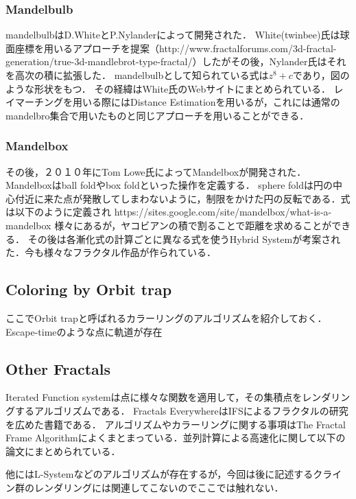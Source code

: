 \subsubsection{Mandelbulb}
mandelbulbはD.WhiteとP.Nylanderによって開発された．
White(twinbee)氏は球面座標を用いるアプローチを提案（http://www.fractalforums.com/3d-fractal-generation/true-3d-mandlebrot-type-fractal/）したがその後，Nylander氏はそれを高次の積に拡張した．
mandelbulbとして知られている式は$z^8 + c $であり，図のような形状をもつ．
その経緯はWhite氏のWebサイトにまとめられている．
レイマーチングを用いる際にはDistance Estimationを用いるが，これには通常のmandelbro集合で用いたものと同じアプローチを用いることができる．

\subsubsection{Mandelbox}
その後，２０１０年にTom Lowe氏によってMandelboxが開発された．
Mandelboxはball foldやbox foldといった操作を定義する．
sphere foldは円の中心付近に来た点が発散してしまわないように，制限をかけた円の反転である．式は以下のように定義され
https://sites.google.com/site/mandelbox/what-is-a-mandelbox
様々にあるが，ヤコビアンの積で割ることで距離を求めることができる．
その後は各漸化式の計算ごとに異なる式を使うHybrid Systemが考案された．今も様々なフラクタル作品が作られている．

\subsection{Coloring by Orbit trap}

ここでOrbit trapと呼ばれるカラーリングのアルゴリズムを紹介しておく．Escape-timeのような点に軌道が存在

\subsection{Other Fractals}

Iterated Function systemは点に様々な関数を適用して，その集積点をレンダリングするアルゴリズムである．
Fractals EverywhereはIFSによるフラクタルの研究を広めた書籍である．
アルゴリズムやカラーリングに関する事項はThe Fractal Frame Algorithmによくまとまっている．並列計算による高速化に関して以下の論文にまとめられている．

他にはL-Systemなどのアルゴリズムが存在するが，今回は後に記述するクライン群のレンダリングには関連してこないのでここでは触れない．


